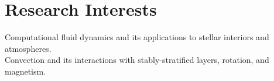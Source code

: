 \section{Research Interests}

Computational fluid dynamics and its applications to stellar interiors and atmospheres. \\
Convection and its interactions with stably-stratified layers, rotation, and magnetism.

